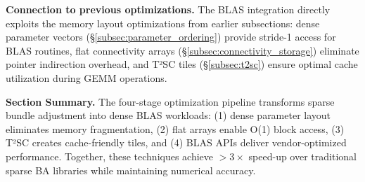 \textbf{Connection to previous optimizations.} The BLAS integration directly exploits the memory 
layout optimizations from earlier subsections: dense parameter vectors (§\ref{subsec:parameter_ordering}) 
provide stride-1 access for BLAS routines, flat connectivity arrays (§\ref{subsec:connectivity_storage}) 
eliminate pointer indirection overhead, and T²SC tiles (§\ref{subsec:t2sc}) ensure optimal cache 
utilization during GEMM operations.

\textbf{Section Summary.} The four-stage optimization pipeline transforms sparse bundle adjustment 
into dense BLAS workloads: (1) dense parameter layout eliminates memory fragmentation, 
(2) flat arrays enable O(1) block access, (3) T²SC creates cache-friendly tiles, and 
(4) BLAS APIs deliver vendor-optimized performance. Together, these techniques achieve 
$>3\times$ speed-up over traditional sparse BA libraries while maintaining numerical accuracy.

